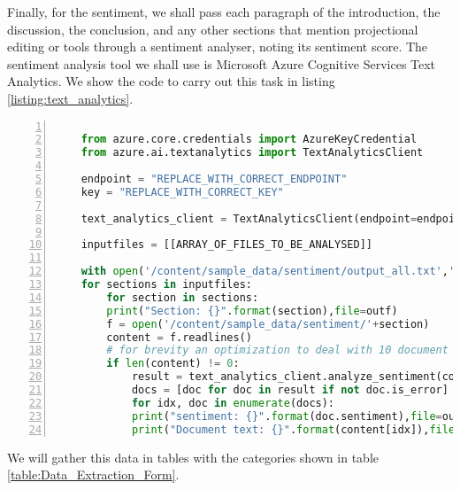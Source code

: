 Finally, for the sentiment, we shall pass each paragraph of the introduction, the discussion, the conclusion, and any other sections that mention projectional editing or tools through a sentiment analyser, noting its sentiment score.
The sentiment analysis tool we shall use is Microsoft Azure Cognitive Services Text Analytics.
We show the code to carry out this task in listing \ref{listing:text_analytics}.

\noindent\begin{minipage}[h]{\textwidth}
    \begin{lstlisting}[language=Python, numbers=left, caption=Text Analytics code, captionpos=b, label=listing:text_analytics, breaklines=true]

    from azure.core.credentials import AzureKeyCredential
    from azure.ai.textanalytics import TextAnalyticsClient
    
    endpoint = "REPLACE_WITH_CORRECT_ENDPOINT"
    key = "REPLACE_WITH_CORRECT_KEY"
    
    text_analytics_client = TextAnalyticsClient(endpoint=endpoint, credential=AzureKeyCredential(key))
    
    inputfiles = [[ARRAY_OF_FILES_TO_BE_ANALYSED]]
    
    with open('/content/sample_data/sentiment/output_all.txt','a') as outf:
    for sections in inputfiles:
        for section in sections:
        print("Section: {}".format(section),file=outf)
        f = open('/content/sample_data/sentiment/'+section)
        content = f.readlines()
        # for brevity an optimization to deal with 10 document limit is removed
        if len(content) != 0:
            result = text_analytics_client.analyze_sentiment(content, show_opinion_mining=True)
            docs = [doc for doc in result if not doc.is_error]
            for idx, doc in enumerate(docs):
            print("sentiment: {}".format(doc.sentiment),file=outf)
            print("Document text: {}".format(content[idx]),file=outf)
    \end{lstlisting}
\end{minipage}

We will gather this data in tables with the categories shown in table \ref{table:Data_Extraction_Form}.

